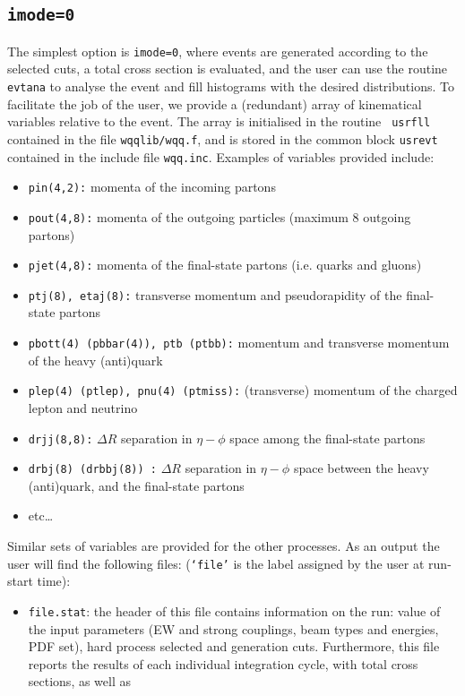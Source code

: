 \documentclass[paper]{JHEP3}
\begin{document}
\begin{appendix}
\subsection{{\tt imode=0}}
The simplest option is {\tt imode=0}, where events are generated
according to the selected cuts, a total cross section is evaluated,
and the user can use the routine {\tt evtana} to analyse the event and
fill histograms with the desired distributions. To facilitate the job
of the user, we provide a (redundant) array of kinematical variables
relative to the event. The array is initialised in the routine {\tt
  usrfll} contained in the file {\tt wqqlib/wqq.f}, and is 
stored in the common block 
{\tt usrevt} contained in the include file {\tt wqq.inc}. Examples of
variables provided include:
\begin{itemize}
\item {\tt pin(4,2):} momenta of the incoming partons
\item {\tt pout(4,8):} momenta of the outgoing particles (maximum 8
  outgoing partons)
\item {\tt pjet(4,8):} momenta of the final-state partons
  (i.e. quarks and gluons)
\item {\tt ptj(8), etaj(8):} transverse momentum and pseudorapidity
  of the final-state partons
\item {\tt pbott(4) (pbbar(4)), ptb (ptbb):} momentum and transverse
  momentum of the heavy (anti)quark 
\item {\tt plep(4) (ptlep), pnu(4) (ptmiss):} (transverse) momentum 
 of the charged lepton and neutrino
\item {\tt drjj(8,8):}  $\Delta R$ separation in $\eta-\phi$ space
  among the final-state partons
\item {\tt drbj(8) (drbbj(8)) :}  $\Delta R$ separation in $\eta-\phi$ space
  between the heavy (anti)quark, and the final-state partons
\item etc\dots
\end{itemize}
Similar sets of variables are provided for the other processes.  As an
output the user will find the following files: ({\tt `file'} is the
label assigned by the user at run-start time):
\begin{itemize}
\item {\tt file.stat}: the header of this file contains information on
  the run: value of the input parameters (EW and strong couplings,
  beam types and energies, PDF set), hard process selected and
  generation cuts. Furthermore, this file reports the results of each
  individual integration cycle, with total cross sections, as well as

\end{itemize}
\end{appendix}
\end{document}
